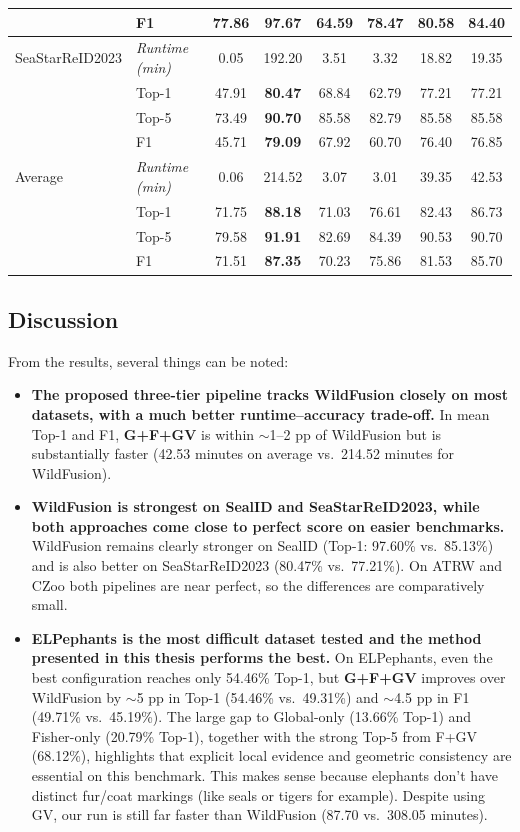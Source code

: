 \begin{longtable}{l l c c c c c c}
 & F1 & 77.86 & \textbf{97.67} & 64.59 & 78.47 & 80.58 & 84.40 \\
\hline
SeaStarReID2023 & \textit{Runtime (min)} & 0.05 & 192.20 & 3.51 & 3.32 & 18.82 & 19.35 \\
 & Top-1 & 47.91 & \textbf{80.47} & 68.84 & 62.79 & 77.21 & 77.21 \\
 & Top-5 & 73.49 & \textbf{90.70} & 85.58 & 82.79 & 85.58 & 85.58 \\
 & F1 & 45.71 & \textbf{79.09} & 67.92 & 60.70 & 76.40 & 76.85 \\
\hline
Average & \textit{Runtime (min)} & 0.06 & 214.52 & 3.07 & 3.01 & 39.35 & 42.53 \\
 & Top-1 & 71.75 & \textbf{88.18} & 71.03 & 76.61 & 82.43 & 86.73 \\
 & Top-5 & 79.58 & \textbf{91.91} & 82.69 & 84.39 & 90.53 & 90.70 \\
 & F1 & 71.51 & \textbf{87.35} & 70.23 & 75.86 & 81.53 & 85.70 \\
\hline
\end{longtable}
\endgroup


\subsection{Discussion}

From the results, several things can be noted:

\begin{itemize}
    \item \textbf{The proposed three-tier pipeline tracks WildFusion closely on most datasets, with a much better runtime--accuracy trade-off.} In mean Top-1 and F1, \textbf{G+F+GV} is within $\sim$1--2 pp of WildFusion but is substantially faster (42.53 minutes on average vs.\ 214.52 minutes for WildFusion).
    \item \textbf{WildFusion is strongest on SealID and SeaStarReID2023, while both approaches come close to perfect score on easier benchmarks.} WildFusion remains clearly stronger on SealID (Top-1: 97.60\% vs.\ 85.13\%) and is also better on SeaStarReID2023 (80.47\% vs.\ 77.21\%). 
     On ATRW and CZoo both pipelines are near perfect, so the differences are comparatively small.
    \item \textbf{ELPephants is the most difficult dataset tested and the method presented in this thesis performs the best.} On ELPephants, even the best configuration reaches only 54.46\% Top-1, but \textbf{G+F+GV} improves over WildFusion by \(\sim\)5 pp in Top-1 
    (54.46\% vs.\ 49.31\%) and \(\sim\)4.5 pp in F1 (49.71\% vs.\ 45.19\%). The large gap 
    to Global-only (13.66\% Top-1) and Fisher-only (20.79\% Top-1), together with the strong Top-5
     from F+GV (68.12\%), highlights that explicit local evidence and geometric consistency are essential on this benchmark. This makes sense because elephants don't have distinct fur/coat markings (like seals or tigers for example).
      Despite using GV, our run is still far faster than WildFusion (87.70 vs.\ 308.05 minutes).
      
\end{itemize}

